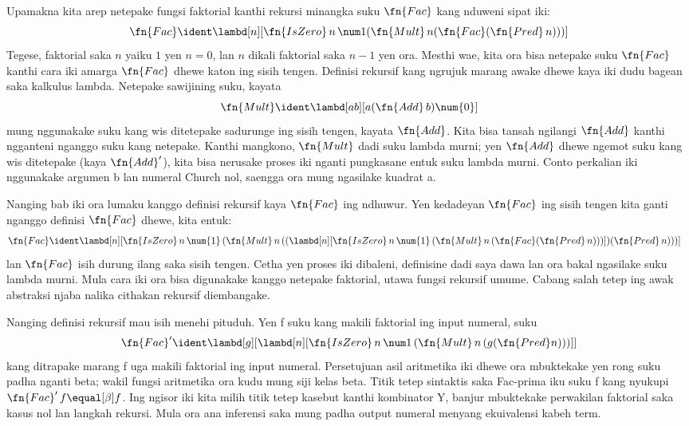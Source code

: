 \documentclass[../../../include/open-logic-section]{subfiles}
\begin{document}


Upamakna kita arep netepake fungsi faktorial kanthi rekursi minangka
suku $\fn{Fac}$ kang nduweni sipat iki:
\[
\fn{Fac} \ident \lambd[n][\fn{IsZero}\, n\, \num 1 (\fn{Mult}\, n (\fn{Fac}(\fn{Pred} \, n)))]
\]
Tegese, faktorial saka $n$ yaiku $1$ yen $n = 0$, lan $n$ dikali
faktorial saka $n-1$ yen ora. Mesthi wae, kita ora bisa netepake suku
$\fn{Fac}$ kanthi cara iki amarga $\fn{Fac}$ dhewe katon ing sisih
tengen. Definisi rekursif kang ngrujuk marang awake dhewe kaya iki
dudu bagean saka kalkulus lambda. Netepake sawijining suku, kayata
\[
\fn{Mult} \ident \lambd[ab][a (\fn{Add}\, b) \num{0}]
\]
mung nggunakake suku kang wis ditetepake sadurunge ing sisih tengen,
kayata $\fn{Add}$. Kita bisa tansah ngilangi $\fn{Add}$ kanthi ngganteni
nganggo suku kang netepake. Kanthi mangkono, $\fn{Mult}$ dadi suku
lambda murni; yen $\fn{Add}$ dhewe ngemot suku kang wis ditetepake
(kaya $\fn{Add}'$), kita bisa nerusake proses iki nganti pungkasane
entuk suku lambda murni. Conto perkalian iki nggunakake argumen b lan numeral Church nol, saengga ora mung ngasilake kuadrat a.

Nanging bab iki ora lumaku kanggo definisi rekursif kaya
$\fn{Fac}$ ing ndhuwur. Yen kedadeyan $\fn{Fac}$ ing sisih tengen
kita ganti nganggo definisi $\fn{Fac}$ dhewe, kita entuk:
\begin{align*}
  \fn{Fac} & \ident \lambd[n][\fn{IsZero}\, n\, \num{1}\,
    (\fn{Mult}\, n\,
      ((\lambd[n][\fn{IsZero}\, n\, \num{1}\,
        (\fn{Mult}\, n\, (\fn{Fac}(\fn{Pred}\, n)))])
       (\fn{Pred}\, n)))]
\end{align*}
lan $\fn{Fac}$ isih durung ilang saka sisih tengen.
Cetha yen proses iki dibaleni, definisine dadi saya dawa
lan ora bakal ngasilake suku lambda murni. Mula cara iki
ora bisa digunakake kanggo netepake faktorial, utawa
fungsi rekursif umume. Cabang salah tetep ing awak abstraksi njaba nalika cithakan rekursif diembangake.

Nanging definisi rekursif mau isih menehi pituduh. Yen f suku kang makili faktorial ing input numeral, suku
\[
\fn{Fac}' \ident \lambd[g][\lambd[n][\fn{IsZero} \, n \, \num 1\, (\fn{Mult} \, n\, (g (\fn{Pred} n)))]]
\]
kang ditrapake marang f uga makili faktorial ing input numeral. Persetujuan asil aritmetika iki dhewe ora mbuktekake yen rong suku padha nganti beta; wakil fungsi aritmetika ora kudu mung siji kelas beta. Titik tetep sintaktis saka Fac-prima iku suku f kang nyukupi $\fn{Fac}'\,f\equal[\beta]f$. Ing ngisor iki kita milih titik tetep kasebut kanthi kombinator Y, banjur mbuktekake perwakilan faktorial saka kasus nol lan langkah rekursi. Mula ora ana inferensi saka mung padha output numeral menyang ekuivalensi kabeh term.
\end{document}
